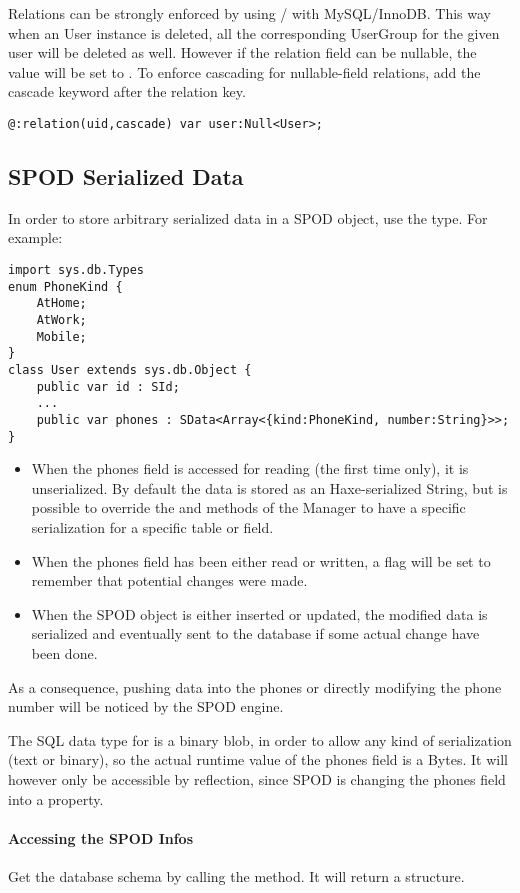 Relations can be strongly enforced by using / with MySQL/InnoDB. This way when an User instance is deleted, all the corresponding UserGroup for the given user will be deleted as well. However if the relation field can be nullable, the value will be set to . To enforce cascading for nullable-field relations, add the cascade keyword after the relation key.

\begin{lstlisting} 
@:relation(uid,cascade) var user:Null<User>;
\end{lstlisting} 


\subsection{SPOD Serialized Data}
\label{std-spod-serialized-data}


In order to store arbitrary serialized data in a SPOD object, use the  type. For example:

\begin{lstlisting} 
import sys.db.Types
enum PhoneKind {
    AtHome;
    AtWork;
    Mobile;
}
class User extends sys.db.Object {
    public var id : SId;
    ...
    public var phones : SData<Array<{kind:PhoneKind, number:String}>>;
}
\end{lstlisting} 

\begin{itemize}
	\item When the phones field is accessed for reading (the first time only), it is unserialized. By default the data is stored as an Haxe-serialized String, but is possible to override the  and  methods of the Manager to have a specific serialization for a specific table or field.
	\item When the phones field has been either read or written, a flag will be set to remember that potential changes were made.
	\item When the SPOD object is either inserted or updated, the modified data is serialized and eventually sent to the database if some actual change have been done.
\end{itemize}

As a consequence, pushing data into the phones  or directly modifying the phone number will be noticed by the SPOD engine.

The SQL data type for  is a binary blob, in order to allow any kind of serialization (text or binary), so the actual runtime value of the phones field is a Bytes. It will however only be accessible by reflection, since SPOD is changing the phones field into a property.

\paragraph{Accessing the SPOD Infos}
Get the database schema by calling the  method. It will return a  structure.
